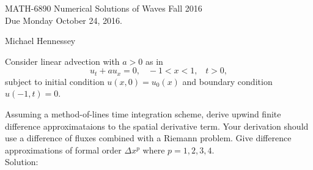 



\begin{center}
\large{ MATH-6890 \hspace{1in} Numerical Solutions of Waves  \hspace{1in}Fall 2016 \\ Due Monday October 24, 2016.}\end{center}
Michael Hennessey

\bigskip
{} \ec
\benum 

\item Consider linear advection with $a>0$ as in
$$u_t+au_x=0,\;\;\; -1<x<1,\;\;\; t>0,$$
subject to initial condition $u(x,0)=u_0(x)$ and boundary condition $u(-1,t)=0.$
\benum
\item Assuming a method-of-lines time integration scheme, derive upwind finite difference approximataions to the spatial derivative term. Your derivation should use a difference of fluxes combined with a Riemann problem. Give difference approximations of formal order $\Delta x^p$ where $p=1,2,3,4.$\\

Solution:\\

